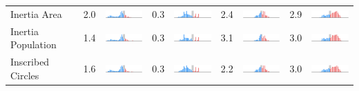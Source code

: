 \begin{table}
\begin{tabular}{lcccccccc}
Inertia Area           &     2.0 &    \includegraphics[width=7em]{comp_hist/il_inertia_a} &     0.3 &    \includegraphics[width=7em]{comp_hist/md_inertia_a} &     2.4 &    \includegraphics[width=7em]{comp_hist/nc_inertia_a} &     2.9 &    \includegraphics[width=7em]{comp_hist/tx_inertia_a} \\
Inertia Population     &     1.4 &    \includegraphics[width=7em]{comp_hist/il_inertia_p} &     0.3 &    \includegraphics[width=7em]{comp_hist/md_inertia_p} &     3.1 &    \includegraphics[width=7em]{comp_hist/nc_inertia_p} &     3.0 &    \includegraphics[width=7em]{comp_hist/tx_inertia_p} \\
Inscribed Circles      &     1.6 &    \includegraphics[width=7em]{comp_hist/il_ehrenburg} &     0.3 &    \includegraphics[width=7em]{comp_hist/md_ehrenburg} &     2.2 &    \includegraphics[width=7em]{comp_hist/nc_ehrenburg} &     3.0 &    \includegraphics[width=7em]{comp_hist/tx_ehrenburg} \\

\end{tabular}
\end{table}
